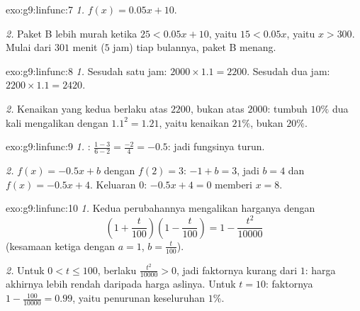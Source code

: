 \begin{solution}{exo:g9:linfunc:7}
\emph{1.} $f(x) = 0.05x + 10$.

\emph{2.} Paket B lebih murah ketika $25 < 0.05x + 10$, yaitu
$15 < 0.05x$, yaitu $x > 300$. Mulai dari $301$ menit ($5$ jam) tiap
bulannya, paket B menang.
\end{solution}

\begin{solution}{exo:g9:linfunc:8}
\emph{1.} Sesudah satu jam: $2000 \times 1.1 = 2200$. Sesudah dua jam:
$2200 \times 1.1 = 2420$.

\emph{2.} Kenaikan yang kedua berlaku atas $2200$, bukan atas $2000$:
tumbuh $10\%$ dua kali mengalikan dengan $1.1^2 = 1.21$, yaitu
kenaikan $21\%$, bukan $20\%$.
\end{solution}

\begin{solution}{exo:g9:linfunc:9}
\emph{1.} : $\frac{1 - 3}{6 - 2} = \frac{-2}{4} = -0.5$:
jadi fungsinya turun.

\emph{2.} $f(x) = -0.5x + b$ dengan $f(2) = 3$: $-1 + b = 3$, jadi
$b = 4$ dan $f(x) = -0.5x + 4$. Keluaran $0$: $-0.5x + 4 = 0$ memberi $x = 8$.
\end{solution}

\begin{solution}{exo:g9:linfunc:10}
\emph{1.} Kedua perubahannya mengalikan harganya dengan
\[
\left(1 + \frac{t}{100}\right)\left(1 - \frac{t}{100}\right)
= 1 - \frac{t^2}{10000}
\]
(kesamaan ketiga dengan $a = 1$, $b = \frac{t}{100}$).

\emph{2.} Untuk $0 < t \leq 100$, berlaku $\frac{t^2}{10000} > 0$,
jadi faktornya kurang dari $1$: harga akhirnya lebih rendah daripada
harga aslinya. Untuk $t = 10$: faktornya
$1 - \frac{100}{10000} = 0.99$, yaitu penurunan keseluruhan $1\%$.
\end{solution}

